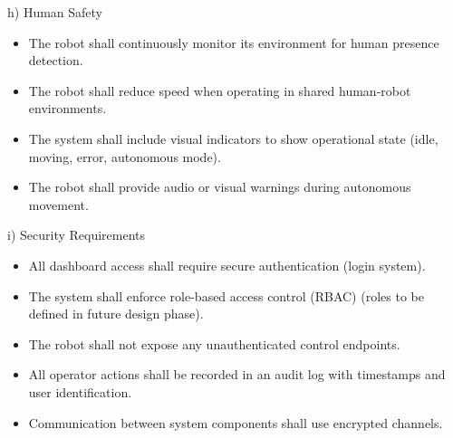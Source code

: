 h) Human Safety

\begin{itemize}
    \item The robot shall continuously monitor its environment for human presence detection.
    \item The robot shall reduce speed when operating in shared human-robot environments.
    \item The system shall include visual indicators to show operational state (idle, moving,
error, autonomous mode).

    \item The robot shall provide audio or visual warnings during autonomous movement.
\end{itemize}

i)    Security Requirements

\begin{itemize}
    \item All dashboard access shall require secure authentication (login system).
    \item The system shall enforce role-based access control (RBAC) (roles to be defined in
future design phase).

    \item The robot shall not expose any unauthenticated control endpoints.
    \item All operator actions shall be recorded in an audit log with timestamps and user
identification.

    \item Communication between system components shall use encrypted channels.
\end{itemize}

